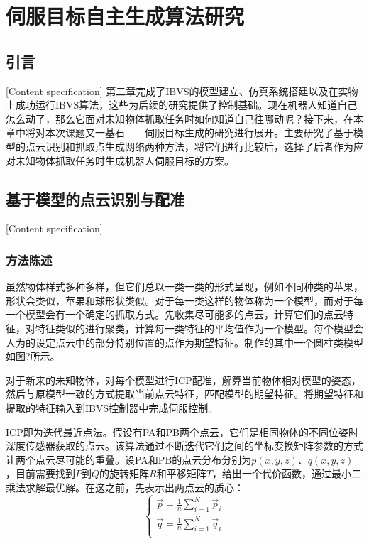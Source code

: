 \documentclass[fontset=fandol,type=bachelor,campus=harbin]{hithesisbook}
\begin{document}
\chapter[伺服目标生成算法研究]{伺服目标自主生成算法研究}
\section{引言}[Content specification]
第二章完成了IBVS的模型建立、仿真系统搭建以及在实物上成功运行IBVS算法，这些为后续的研究提供了控制基础。现在机器人知道自己怎么动了，那么它面对未知物体抓取任务时如何知道自己往哪动呢？接下来，在本章中将对本次课题又一基石——伺服目标生成的研究进行展开。主要研究了基于模型的点云识别和抓取点生成网络两种方法，将它们进行比较后，选择了后者作为应对未知物体抓取任务时生成机器人伺服目标的方案。


\section{基于模型的点云识别与配准}[Content specification]
\subsection{方法陈述}
虽然物体样式多种多样，但它们总以一类一类的形式呈现，例如不同种类的苹果，形状会类似，苹果和球形状类似。对于每一类这样的物体称为一个模型，而对于每一个模型会有一个确定的抓取方式。先收集尽可能多的点云，计算它们的点云特征，对特征类似的进行聚类，计算每一类特征的平均值作为一个模型。每个模型会人为的设定点云中的部分特别位置的点作为期望特征。制作的其中一个圆柱类模型{\color{red}如图?所示}。


对于新来的未知物体，对每个模型进行ICP配准，解算当前物体相对模型的姿态，然后与原模型一致的方式提取当前点云特征，匹配模型的期望特征。将期望特征和提取的特征输入到IBVS控制器中完成伺服控制。


ICP即为迭代最近点法。假设有PA和PB两个点云，它们是相同物体的不同位姿时深度传感器获取的点云。该算法通过不断迭代它们之间的坐标变换矩阵参数的方式让两个点云尽可能的重叠\cite{chetverikov2002trimmed}。设PA和PB的点云分布分别为$p\left( x,y,z \right) $、$q\left( x,y,z \right) $，目前需要找到$P$到$Q$的旋转矩阵$R$和平移矩阵$T$，给出一个代价函数，通过最小二乘法求解最优解。在这之前，先表示出两点云的质心：
\begin{equation}
\left\{ \begin{array}{c}
	\vec{p}=\frac{1}{n}\sum_{i=1}^N{\vec{p}_i}\\
	\vec{q}=\frac{1}{n}\sum_{i=1}^N{\vec{q}_i}\\
\end{array} \right. 
\label{点云质心描述1} 
\end{equation}
\end{document}
